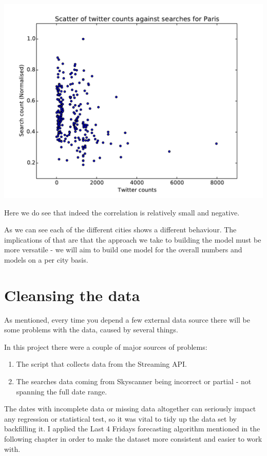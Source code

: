 \documentclass[minf,frontabs,twoside,singlespacing,parskip]{infthesis}
\begin{document}
\includegraphics[width=\textwidth]{Paris}

Here we do see that indeed the correlation is relatively small and negative. 

As we can see each of the different cities shows a different behaviour. The implications of that are that the approach we take to building the model must be more versatile - we will aim to build one model for the overall numbers and models on a per city basis.

\section{Cleansing the data}

As mentioned, every time you depend a few external data source there will be some problems with the data, caused by several things. 

In this project there were a couple of major sources of problems:
\begin{enumerate}
\item The script that collects data from the Streaming API.
\item The searches data coming from Skyscanner being incorrect or partial - not spanning the full date range.
\end{enumerate}

The dates with incomplete data or missing data altogether can seriously impact any regression or statistical test, so it was vital to tidy up the data set by backfilling it. I applied the Last 4 Fridays forecasting algorithm mentioned in the following chapter in order to make the dataset more consistent and easier to work with. 
\end{document}
